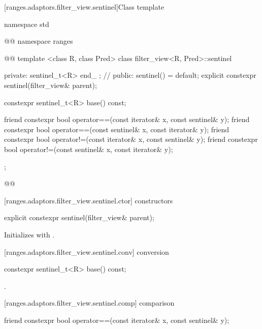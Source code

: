 [ranges.adaptors.filter_view.sentinel]{Class template }

%
\begin{codeblock}
namespace std { @@ namespace ranges { @@
  template <class R, class Pred>
  class filter_view<R, Pred>::sentinel {
  private:
    sentinel_t<R> end_ {}; // \expos
  public:
    sentinel() = default;
    explicit constexpr sentinel(filter_view& parent);

    constexpr sentinel_t<R> base() const;

    friend constexpr bool operator==(const iterator& x, const sentinel& y);
    friend constexpr bool operator==(const sentinel& x, const iterator& y);
    friend constexpr bool operator!=(const iterator& x, const sentinel& y);
    friend constexpr bool operator!=(const sentinel& x, const iterator& y);
  };
}}@\removed{\}\}}@
\end{codeblock}

[ranges.adaptors.filter_view.sentinel.ctor]{ constructors}

%
\begin{itemdecl}
explicit constexpr sentinel(filter_view& parent);
\end{itemdecl}

\begin{itemdescr}
\pnum
\effects Initializes  with .
\end{itemdescr}

[ranges.adaptors.filter_view.sentinel.conv]{ conversion}

%
\begin{itemdecl}
constexpr sentinel_t<R> base() const;
\end{itemdecl}

\begin{itemdescr}
\pnum
\returns {}.
\end{itemdescr}

[ranges.adaptors.filter_view.sentinel.comp]{ comparison}

%
\begin{itemdecl}
friend constexpr bool operator==(const iterator& x, const sentinel& y);
\end{itemdecl}

